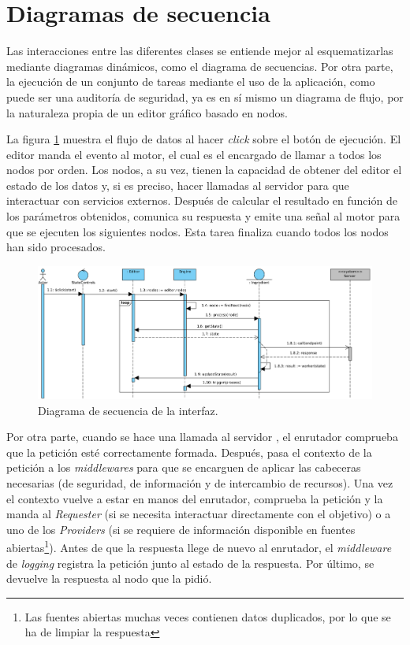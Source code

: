 \section{Diagramas de secuencia} \label{sec:sequencediagram}

Las interacciones entre las diferentes clases se entiende mejor al esquematizarlas mediante diagramas dinámicos, como el diagrama de secuencias. Por otra parte, la ejecución de un conjunto de tareas mediante el uso de la aplicación, como puede ser una auditoría de seguridad, ya es en sí mismo un diagrama de flujo, por la naturaleza propia de un editor gráfico basado en nodos.\sn

\newpage

La figura \ref{fig:seqdiagraminterface} muestra el flujo de datos al hacer \textit{click} sobre el botón de ejecución. El editor manda el evento al motor, el cual es el encargado de llamar a todos los nodos por orden. Los nodos, a su vez, tienen la capacidad de obtener del editor el estado de los datos y, si es preciso, hacer llamadas al servidor para que interactuar con servicios externos. Después de calcular el resultado en función de los parámetros obtenidos, comunica su respuesta y emite una señal al motor para que se ejecuten los siguientes nodos. Esta tarea finaliza cuando todos los nodos han sido procesados.\sn

\begin{figure}[H]
    \centering
    \includegraphics[width=15cm]{img/tables/23_Sequence-Diagram-Interface.png}
    \caption{Diagrama de secuencia de la interfaz.}
    \label{fig:seqdiagraminterface}
\end{figure}

Por otra parte, cuando se hace una llamada al servidor , el enrutador comprueba que la petición esté correctamente formada. Después, pasa el contexto de la petición a los \textit{middlewares} para que se encarguen de aplicar las cabeceras necesarias (de seguridad, de información y de intercambio de recursos). Una vez el contexto vuelve a estar en manos del enrutador, comprueba la petición y la manda al \textit{Requester} (si se necesita interactuar directamente con el objetivo) o a uno de los \textit{Providers} (si se requiere de información disponible en fuentes abiertas\footnote{Las fuentes abiertas muchas veces contienen datos duplicados, por lo que se ha de limpiar la respuesta}). Antes de que la respuesta llege de nuevo al enrutador, el \textit{middleware} de \textit{logging} registra la petición junto al estado de la respuesta. Por último, se devuelve la respuesta al nodo que la pidió.\sn


